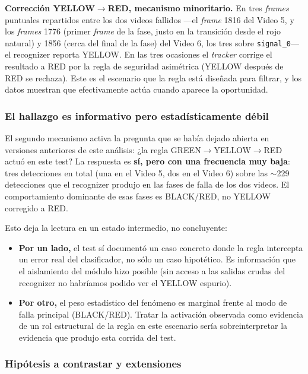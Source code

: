 \textbf{Corrección YELLOW$\to$RED, mecanismo minoritario.} En tres \textit{frames} puntuales repartidos entre los dos videos fallidos ---el \textit{frame} 1816 del Video 5, y los \textit{frames} 1776 (primer \textit{frame} de la fase, justo en la transición desde el rojo natural) y 1856 (cerca del final de la fase) del Video 6, los tres sobre \texttt{signal\_0}--- el recognizer reporta YELLOW. En las tres ocasiones el \textit{tracker} corrige el resultado a RED por la regla de seguridad asimétrica (YELLOW después de RED se rechaza). Este es el escenario que la regla está diseñada para filtrar, y los datos muestran que efectivamente actúa cuando aparece la oportunidad.

\subsubsection{El hallazgo es informativo pero estadísticamente débil}

El segundo mecanismo activa la pregunta que se había dejado abierta en versiones anteriores de este análisis: ¿la regla GREEN$\to$YELLOW$\to$RED actuó en este test? La respuesta es \textbf{sí, pero con una frecuencia muy baja}: tres detecciones en total (una en el Video 5, dos en el Video 6) sobre las $\sim$229 detecciones que el recognizer produjo en las fases de falla de los dos videos. El comportamiento dominante de esas fases es BLACK/RED, no YELLOW corregido a RED.

Esto deja la lectura en un estado intermedio, no concluyente:

\begin{itemize}
    \item \textbf{Por un lado,} el test sí documentó un caso concreto donde la regla intercepta un error real del clasificador, no sólo un caso hipotético. Es información que el aislamiento del módulo hizo posible (sin acceso a las salidas crudas del recognizer no habríamos podido ver el YELLOW espurio).

    \item \textbf{Por otro,} el peso estadístico del fenómeno es marginal frente al modo de falla principal (BLACK/RED). Tratar la activación observada como evidencia de un rol estructural de la regla en este escenario sería sobreinterpretar la evidencia que produjo esta corrida del test.
\end{itemize}

\subsubsection{Hipótesis a contrastar y extensiones}

